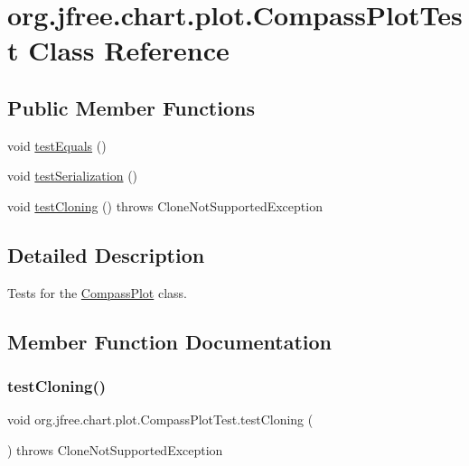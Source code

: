 \hypertarget{classorg_1_1jfree_1_1chart_1_1plot_1_1_compass_plot_test}{}\section{org.\+jfree.\+chart.\+plot.\+Compass\+Plot\+Test Class Reference}
\label{classorg_1_1jfree_1_1chart_1_1plot_1_1_compass_plot_test}
\subsection*{Public Member Functions}
\begin{DoxyCompactItemize}
\item 
void \mbox{\hyperlink{classorg_1_1jfree_1_1chart_1_1plot_1_1_compass_plot_test_aac4ecadb82b48e465e6cd133ea0ca622}{test\+Equals}} ()
\item 
void \mbox{\hyperlink{classorg_1_1jfree_1_1chart_1_1plot_1_1_compass_plot_test_ab7a717a3548f806b5240268de3a6da17}{test\+Serialization}} ()
\item 
void \mbox{\hyperlink{classorg_1_1jfree_1_1chart_1_1plot_1_1_compass_plot_test_a3d129186ea64df62da6873d8e9bd0a72}{test\+Cloning}} ()  throws Clone\+Not\+Supported\+Exception 
\end{DoxyCompactItemize}


\subsection{Detailed Description}
Tests for the \mbox{\hyperlink{classorg_1_1jfree_1_1chart_1_1plot_1_1_compass_plot}{Compass\+Plot}} class. 

\subsection{Member Function Documentation}
\mbox{\label{classorg_1_1jfree_1_1chart_1_1plot_1_1_compass_plot_test_a3d129186ea64df62da6873d8e9bd0a72}} 
\subsubsection{\texorpdfstring{test\+Cloning()}{testCloning()}}
{\footnotesize\ttfamily void org.\+jfree.\+chart.\+plot.\+Compass\+Plot\+Test.\+test\+Cloning (\begin{DoxyParamCaption}{ }\end{DoxyParamCaption}) throws Clone\+Not\+Supported\+Exception}

